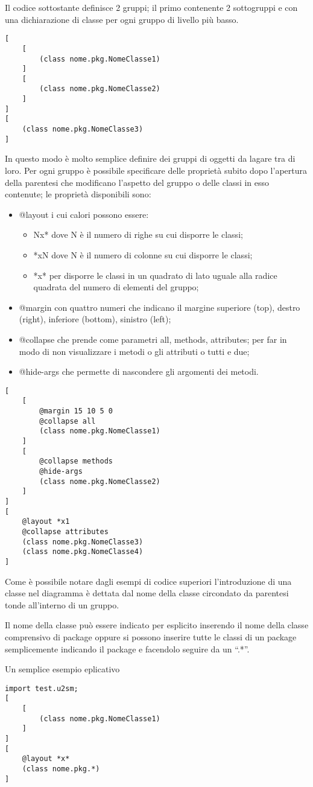 Il codice sottostante definisce 2 gruppi; il primo contenente 2 sottogruppi e
 con una dichiarazione di classe per ogni gruppo di livello più basso.

\begin{lstlisting}[caption={Un semplice diagramma}, style={layout}] 
[
	[
		(class nome.pkg.NomeClasse1)
	]
	[
		(class nome.pkg.NomeClasse2)
	]
]
[
	(class nome.pkg.NomeClasse3)
]
\end{lstlisting}

In questo modo è molto semplice definire dei gruppi di oggetti da lagare tra di
loro. Per ogni gruppo è possibile specificare delle proprietà subito dopo
l'apertura della parentesi che modificano l'aspetto del gruppo o delle classi in
esso contenute; le proprietà disponibili sono:

\begin{itemize}
  \item @layout i cui calori possono essere:
  \begin{itemize}
  	\item Nx* dove N è il numero di righe su cui disporre le classi;
  	\item *xN dove N è il numero di colonne su cui disporre le classi;
  	\item *x* per disporre le classi in un quadrato di lato uguale alla radice
  	quadrata del numero di elementi del gruppo;
  \end{itemize}
  
  \item @margin con quattro numeri che indicano il margine superiore (top),
  destro (right), inferiore (bottom), sinistro (left);
  \item @collapse che prende come parametri all, methods, attributes; per far in
  modo di non visualizzare i metodi o gli attributi o tutti e due;
  \item @hide-args che permette di nascondere gli argomenti dei metodi.
\end{itemize}

\begin{lstlisting}[caption={Diagramma decorato di attributi}, style={layout}] 
[
	[	
		@margin 15 10 5 0
		@collapse all
		(class nome.pkg.NomeClasse1)
	]
	[
		@collapse methods
		@hide-args
		(class nome.pkg.NomeClasse2)
	]
]
[
	@layout *x1
	@collapse attributes
	(class nome.pkg.NomeClasse3)
	(class nome.pkg.NomeClasse4)
]
\end{lstlisting}


Come è possibile notare dagli esempi di codice superiori l'introduzione di una
classe nel diagramma è dettata dal nome della classe circondato da parentesi
tonde all'interno di un gruppo.

Il nome della classe può essere indicato per esplicito inserendo il nome della
classe comprensivo di package oppure si possono inserire tutte le classi di un
package semplicemente indicando il package e facendolo seguire da un ``.*''.

Un semplice esempio eplicativo

\begin{lstlisting}[caption={Diagramma decorato di attributi}, style={layout}] 
import test.u2sm;
[
	[	
		(class nome.pkg.NomeClasse1)
	]
]
[
	@layout *x*
	(class nome.pkg.*)
]
\end{lstlisting}
